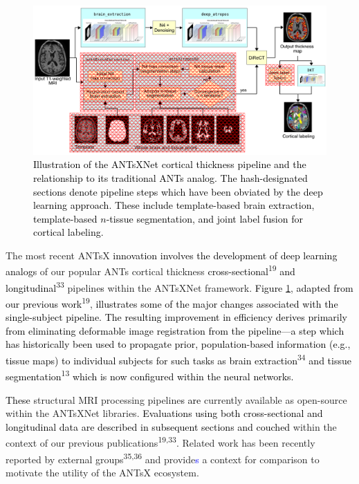 \documentclass[12pt,]{article}
\begin{document}
\begin{figure}[htb]
  \centering
    \includegraphics[width=\textwidth]{Figures/antsxnetPipeline.pdf}
  \caption{\textcolor{black}{Illustration of the ANTsXNet cortical thickness pipeline and the
  relationship to its traditional ANTs analog.  The hash-designated sections
  denote pipeline steps which have been obviated by the deep learning approach.
  These include template-based brain extraction, template-based $n$-tissue
  segmentation, and joint label fusion for cortical labeling.}}
  \label{fig:pipeline}
\end{figure}

The most recent ANTsX
\textcolor{black}{innovation involves the development of
deep learning analogs} of our popular ANTs cortical thickness
\textcolor{black}{cross-sectional}\textsuperscript{19}
\textcolor{black}{and
longitudinal}\textsuperscript{33} pipeline\textcolor{black}{s} within
the ANTsXNet framework. \textcolor{black}{Figure} \ref{fig:pipeline},
\textcolor{black}{adapted from our previous work}\textsuperscript{19},
\textcolor{black}{illustrates some of the major changes associated with the
single-subject pipeline.  The resulting improvement in efficiency
derives primarily from eliminating deformable image registration from the
pipeline---a step which has historically been used to propagate prior,
population-based information (e.g., tissue maps) to individual subjects for such
tasks as brain extraction}\textsuperscript{34}
\textcolor{black}{and tissue
segmentation}\textsuperscript{13}
\textcolor{black}{which is now configured within
the neural networks.}

\textcolor{black}{These} structural MRI processing
pipeline\textcolor{black}{s
are} currently available as open-source within the ANTsXNet libraries.
\textcolor{black}{Evaluations using both cross-sectional and longitudinal data
are described in subsequent sections and couched} within the context of
our previous publications\textsuperscript{19,33}. Related work has been
recently reported by external groups\textsuperscript{35,36} and
provide\textcolor{blue}{s} a context for comparison to motivate the
utility of the ANTsX ecosystem.
\end{document}
